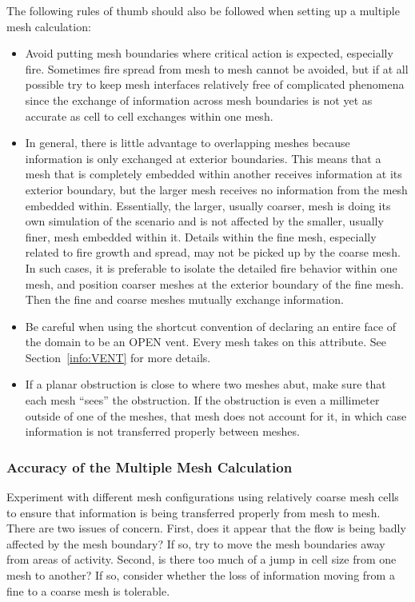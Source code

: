 \documentclass[11pt]{book}
\begin{document}
The following rules of thumb should also be followed when setting up a multiple mesh calculation:
\begin{itemize}
\item Avoid putting mesh boundaries where critical action is expected, especially fire. Sometimes fire spread from mesh to mesh cannot be avoided, but if at all possible try to keep mesh interfaces relatively free of complicated phenomena since the exchange of information across mesh boundaries is not yet as accurate as cell to cell exchanges within one mesh.
\item In general, there is little advantage to overlapping meshes because information is only exchanged at exterior boundaries. This means that a mesh that is completely embedded within another receives information at its exterior boundary, but the larger mesh receives no information from the mesh embedded within. Essentially, the larger, usually coarser, mesh is doing its own simulation of the scenario and is not affected by the smaller, usually finer, mesh embedded within it. Details within the fine mesh, especially related to fire growth and spread, may not be picked up by the coarse mesh. In such cases, it is preferable to isolate the detailed fire behavior within one mesh, and position coarser meshes at the exterior boundary of the fine mesh. Then the fine and coarse meshes mutually exchange information.
\item Be careful when using the shortcut convention of declaring an entire face of the domain to be an {\ct OPEN} vent. Every mesh takes on this attribute. See Section~\ref{info:VENT} for more details.
\item If a planar obstruction is close to where two meshes abut, make sure that each mesh ``sees'' the obstruction. If the obstruction is even a millimeter outside of one of the meshes, that mesh does not account for it, in which case information is not transferred properly between meshes.
\end{itemize}


\subsubsection{Accuracy of the Multiple Mesh Calculation}

Experiment with different mesh configurations using relatively coarse mesh cells to ensure that information is being transferred properly from mesh to mesh. There are two issues of concern. First, does it appear that the flow is being badly affected by the mesh boundary? If so, try to move the mesh boundaries away from areas of activity. Second, is there too much of a jump in cell size from one mesh to another? If so, consider whether the loss of information moving from a fine to a coarse mesh is tolerable.
\end{document}
